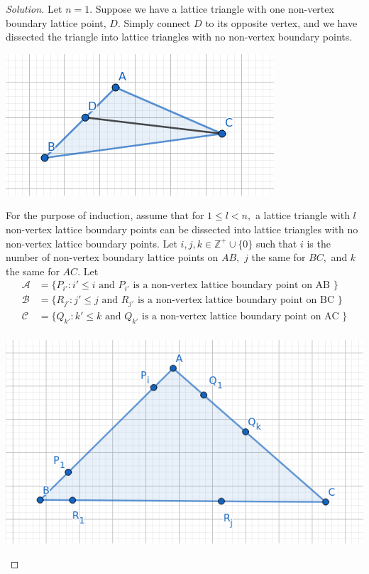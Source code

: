 \documentclass[12pt]{article}
\newcommand{\Z}{\mathbb{Z}}
\newenvironment{exercise}[2][Exercise]{\begin{trivlist}
        \item[\hskip \labelsep {\bfseries #1}\hskip \labelsep {\bfseries #2.}]}{\end{trivlist}}
\newenvironment{solution}
        {\begin{proof}[Solution]}
                    {\end{proof}}
\begin{document}
\begin{exercise}{45}
\begin{solution}
        Let \( n = 1. \) Suppose we have a lattice triangle with one non-vertex boundary lattice point, \( D. \) Simply connect \( D \) to its opposite vertex, and we have dissected the triangle into lattice triangles with no non-vertex boundary points.
        \begin{center}
            \includegraphics[scale=.5]{45-1}
        \end{center}
        For the purpose of induction, assume that for \( 1 \leq l < n , \) a lattice triangle with \( l \) non-vertex lattice boundary points can be dissected into lattice triangles with no non-vertex lattice boundary points. Let \( i,j,k \in \Z^{+} \cup \{0\} \) such that \( i \) is the number of non-vertex boundary lattice points on \( AB, \) \( j \) the same for \( BC, \) and \( k \) the same for \( AC. \) Let
        \begin{align*}
            \mathcal{A} &= \{P_{i'} : i' \leq  i \text{ and } P_{i'} \text{ is a non-vertex lattice boundary point on AB } \}\\
            \mathcal{B} &= \{R_{j'} : j' \leq  j \text{ and } R_{j'} \text{ is a non-vertex lattice boundary point on BC } \}\\
            \mathcal{C} &= \{Q_{k'} : k' \leq  k \text{ and } Q_{k'} \text{ is a non-vertex lattice boundary point on AC } \}\\
        \end{align*}
        \begin{center}
            \includegraphics[scale=.5]{45-2}

\end{center}
\end{solution}
\end{exercise}
\end{document}
